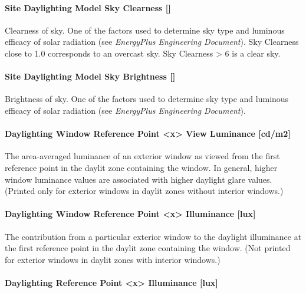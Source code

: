 \paragraph{Site Daylighting Model Sky Clearness {[]}}\label{site-daylighting-model-sky-clearness}

Clearness of sky. One of the factors used to determine sky type and luminous efficacy of solar radiation (see \emph{EnergyPlus Engineering Document}). Sky Clearness close to 1.0 corresponds to an overcast sky. Sky Clearness \textgreater{} 6 is a clear sky.

\paragraph{Site Daylighting Model Sky Brightness {[]}}\label{site-daylighting-model-sky-brightness}

Brightness of sky. One of the factors used to determine sky type and luminous efficacy of solar radiation (see \emph{EnergyPlus Engineering Document}).

\paragraph{Daylighting Window Reference Point <x> View Luminance {[}cd/m2{]}}\label{daylighting-window-reference-point-1-view-luminance-cdm2}

The area-averaged luminance of an exterior window as viewed from the first reference point in the daylit zone containing the window. In general, higher window luminance values are associated with higher daylight glare values. (Printed only for exterior windows in daylit zones without interior windows.)

\paragraph{Daylighting Window Reference Point <x> Illuminance {[}lux{]}}\label{daylighting-window-reference-point-1-illuminance-lux}

The contribution from a particular exterior window to the daylight illuminance at the first reference point in the daylit zone containing the window. (Not printed for exterior windows in daylit zones with interior windows.)

\paragraph{Daylighting Reference Point <x> Illuminance {[}lux{]}}\label{daylighting-reference-point-1-illuminance-lux}

